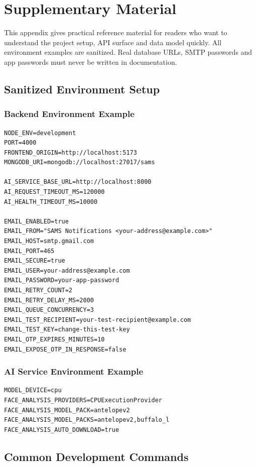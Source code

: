 \chapter{Supplementary Material}
\label{appendix:setup}

This appendix gives practical reference material for readers who want to understand the project setup, API surface and data model quickly. All environment examples are sanitized. Real database URLs, SMTP passwords and app passwords must never be written in documentation.

\section{Sanitized Environment Setup}

\subsection{Backend Environment Example}

\begin{verbatim}
NODE_ENV=development
PORT=4000
FRONTEND_ORIGIN=http://localhost:5173
MONGODB_URI=mongodb://localhost:27017/sams

AI_SERVICE_BASE_URL=http://localhost:8000
AI_REQUEST_TIMEOUT_MS=120000
AI_HEALTH_TIMEOUT_MS=10000

EMAIL_ENABLED=true
EMAIL_FROM="SAMS Notifications <your-address@example.com>"
EMAIL_HOST=smtp.gmail.com
EMAIL_PORT=465
EMAIL_SECURE=true
EMAIL_USER=your-address@example.com
EMAIL_PASSWORD=your-app-password
EMAIL_RETRY_COUNT=2
EMAIL_RETRY_DELAY_MS=2000
EMAIL_QUEUE_CONCURRENCY=3
EMAIL_TEST_RECIPIENT=your-test-recipient@example.com
EMAIL_TEST_KEY=change-this-test-key
EMAIL_OTP_EXPIRES_MINUTES=10
EMAIL_EXPOSE_OTP_IN_RESPONSE=false
\end{verbatim}

\subsection{AI Service Environment Example}

\begin{verbatim}
MODEL_DEVICE=cpu
FACE_ANALYSIS_PROVIDERS=CPUExecutionProvider
FACE_ANALYSIS_MODEL_PACK=antelopev2
FACE_ANALYSIS_MODEL_PACKS=antelopev2,buffalo_l
FACE_ANALYSIS_AUTO_DOWNLOAD=true
\end{verbatim}

\section{Common Development Commands}

